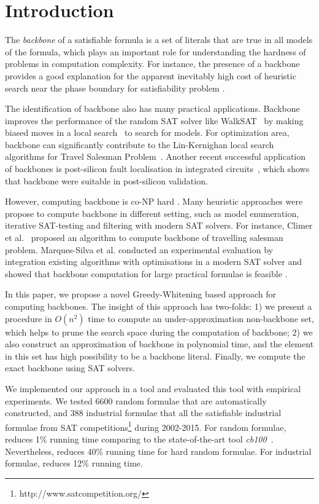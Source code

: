 

\section{Introduction}
The \textit{backbone} of a satisfiable formula is a set of literals that are true in all models of the formula,
which plays an important role for understanding the hardness of problems in computation complexity.
For instance, the presence of a backbone provides a good explanation for the apparent inevitably high cost of heuristic search near the phase boundary  for satisfiability problem \cite{MZKST99}.

The identification of backbone also has many practical applications. Backbone improves the performance of the random SAT solver like  WalkSAT~\cite{SBK1993} by making biased moves in a local search~\cite{ZWR2003,MAR2007} to search for models. For optimization area,  backbone can significantly contribute to the Lin-Kernighan local search algorithms for Travel Salesman Problem~\cite{ZWL2005}. Another recent successful application of backbones is post-silicon fault localisation in integrated circuits~\cite{ZWSM11,ZWM11}, which shows that backbone were suitable in post-silicon validation.

However, computing backbone is co-NP hard \cite{Jan10}.  Many heuristic approaches were propose to compute backbone in different setting, such as model enumeration, iterative SAT-testing and filtering with modern SAT solvers.
For instance, Climer et al.~\cite{CZ2002} proposed an algorithm to compute backbone of travelling salesman problem.
Marques-Silva et al.  conducted an experimental evaluation by integration existing algorithms with optimisations in a modern SAT solver and showed that backbone computation for large practical formulae is feasible \cite{MJML2010,JLMS12,JLM15}.


In this paper, we propose a novel Greedy-Whitening based approach \tool for computing backbones. The insight of this approach has two-folds: 1) we present a procedure in $O(n^2)$ time to compute an under-approximation non-backbone set, which helps to prune the search space during the computation of backbone; 2) we also construct an approximation of backbone in polynomial time, and the element in this set has high possibility to be a backbone literal.
Finally, we compute the exact backbone using SAT solvers.

We implemented our approach in a tool \tool and evaluated this tool with empirical experiments. We tested 6600 random formulae that are automatically constructed, and 388 industrial formulae that all the satisfiable industrial formulae from SAT competitions\footnote{http://www.satcompetition.org/} during 2002-2015. For random formulae, \tool reduces 1\% running time comparing to the state-of-the-art tool \textit{cb100}~\cite{JLM15}. Nevertheless, \tool reduces 40\% running time for hard random formulae. For industrial formulae, \tool reduces 12\% running time.


